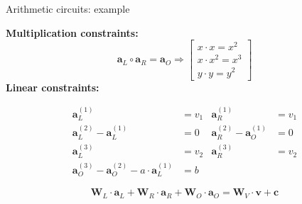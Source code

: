 \documentclass{zkdl-presentation-template}
\begin{document}
    \begin{frame}{Arithmetic circuits: example}
        \begin{example}
            \textbf{Multiplication constraints:}
            \begin{equation*}
                \mathbf{a}_L \circ \mathbf{a}_R = \mathbf{a}_O \Rightarrow \begin{bmatrix}
                    x \cdot x = x^2 \\
                    x \cdot x^2 = x^3 \\
                    y \cdot y = y^2
                \end{bmatrix}
            \end{equation*}
            \pause
            \textbf{Linear constraints:}

            \begin{equation*}
                \begin{aligned}
                    \mathbf{a}_L^{(1)} &= v_1 & \mathbf{a}_R^{(1)} &= v_1 \\
                    \mathbf{a}_L^{(2)} - \mathbf{a}_L^{(1)} &= 0 & \mathbf{a}_R^{(2)} - \mathbf{a}_O^{(1)} &= 0 \\
                    \mathbf{a}_L^{(3)} &= v_2 & \mathbf{a}_R^{(3)} &= v_2 \\
                    \mathbf{a}_O^{(3)} - \mathbf{a}_O^{(2)} - a \cdot \mathbf{a}_L^{(1)} &= b &
                \end{aligned}
            \end{equation*}
            \pause

            \begin{equation*}
            \mathbf{W}_L \cdot \mathbf{a}_L + \mathbf{W}_R \cdot \mathbf{a}_R + \mathbf{W}_O \cdot \mathbf{a}_O = \mathbf{W}_V \cdot \mathbf{v} + \mathbf{c}
            \end{equation*}
        \end{example}
    \end{frame}
\end{document}
